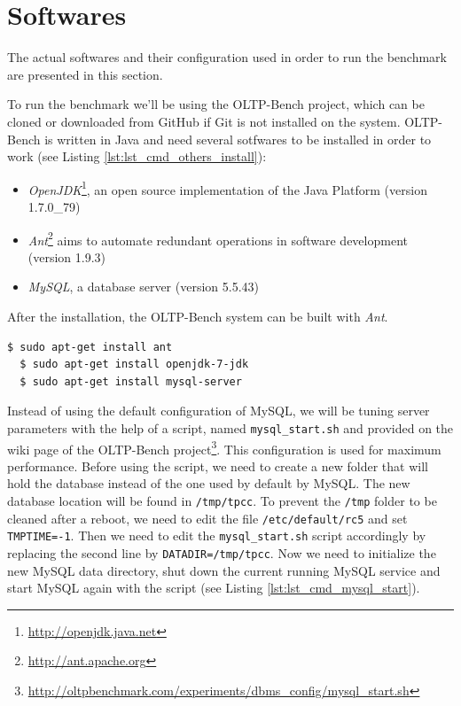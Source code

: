 \section{Softwares}
\label{sec:softwares}
The actual softwares and their configuration used in order to run the benchmark are presented in this section.

To run the benchmark we'll be using the OLTP-Bench project, which can be cloned 
or downloaded from GitHub if Git is not installed on the system. 
OLTP-Bench is written in Java and need several sotfwares to be installed in order to work (see Listing \ref{lst:lst_cmd_others_install}): 

{
\singlespacing
\begin{itemize}
\item \textit{OpenJDK}\footnote{\url{http://openjdk.java.net}}, an open source implementation of the Java Platform (version 1.7.0\_79)
\item \textit{Ant}\footnote{\url{http://ant.apache.org}} aims to automate redundant operations in software development (version 1.9.3)
\item \textit{MySQL}, a database server (version 5.5.43)
\end{itemize}
}

After the installation, the OLTP-Bench system can be built with \textit{Ant}.

{
\singlespacing
\begin{lstlisting}[frame=single,language=bash,caption={Ant, Java and MySQL installation},label={lst:lst_cmd_others_install}]
  $ sudo apt-get install ant
  $ sudo apt-get install openjdk-7-jdk
  $ sudo apt-get install mysql-server
\end{lstlisting}
}

Instead of using the default configuration of MySQL, we will be tuning server parameters with the help of a script, 
named \texttt{mysql\_start.sh} and provided on the wiki page of the OLTP-Bench 
project\footnote{\url{http://oltpbenchmark.com/experiments/dbms_config/mysql_start.sh}}. 
This configuration is used for maximum performance. 
Before using the script, we need to create a new folder that will hold the database instead of the one used by default by MySQL. 
The new database location will be found in \texttt{/tmp/tpcc}. 
To prevent the \texttt{/tmp} folder to be cleaned after a reboot, we need to edit the file \texttt{/etc/default/rc5} and set \texttt{TMPTIME=-1}. 
Then we need to edit the \texttt{mysql\_start.sh} script accordingly by replacing the second line by \texttt{DATADIR=/tmp/tpcc}. 
Now we need to initialize the new MySQL data directory, shut down the current running MySQL service and start MySQL again with the script (see Listing \ref{lst:lst_cmd_mysql_start}).

